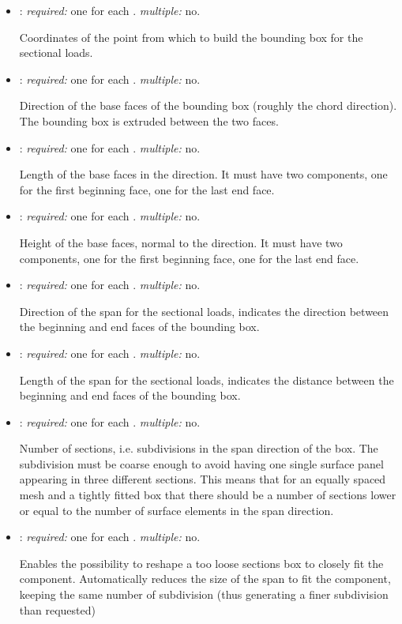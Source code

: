 \begin{itemize}
\item {}: \textit{required:} one for each . 
\textit{multiple:} no.

Coordinates of the point from which to build the bounding box for the sectional loads.

\item {}: \textit{required:} one for each . 
\textit{multiple:} no.

Direction of the base faces of the bounding box (roughly the chord direction). 
The bounding box is extruded between the two faces. 

\item {}: \textit{required:} one for each . 
\textit{multiple:} no.

Length of the base faces in the  direction. It must have 
two components, one for the first beginning face, one for the last end face. 

\item {}: \textit{required:} one for each . 
\textit{multiple:} no.

Height of the base faces, normal to the  direction. It must 
have two components, one for the first beginning face, one for the last end face. 

\item {}: \textit{required:} one for each . 
\textit{multiple:} no.

Direction of the span for the sectional loads, indicates the direction between 
the beginning and end faces of the bounding box.

\item {}: \textit{required:} one for each . 
\textit{multiple:} no.

Length of the span for the sectional loads, indicates the distance between 
the beginning and end faces of the bounding box.

\item {}: \textit{required:} one for each . 
\textit{multiple:} no.

Number of sections, i.e. subdivisions in the span direction of the box. 
The subdivision must be coarse enough to avoid having one single surface 
panel appearing in three different sections. This means that for an equally 
spaced mesh and a tightly fitted box that there should be a number of 
sections lower or equal to the number of surface elements in the span 
direction. 

\item {}: \textit{required:} one for each . 
\textit{multiple:} no.

Enables the possibility to reshape a too loose sections box to closely 
fit the component. Automatically reduces the size of the span to fit the 
component, keeping the same number of subdivision (thus generating a 
finer subdivision than requested)

\end{itemize}

